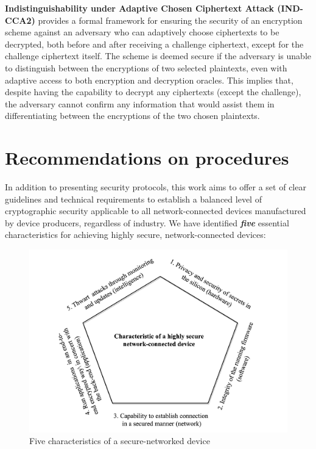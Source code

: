 \documentclass[pdflatex,sn-mathphys-num]{sn-jnl}%
\theoremstyle{thmstyleone}%
\theoremstyle{thmstyletwo}%
\theoremstyle{thmstylethree}%
\begin{document}
\noindent \textbf{Indistinguishability under Adaptive Chosen Ciphertext Attack (IND-CCA2)}  provides a formal framework for ensuring the security of an encryption scheme against an adversary who can adaptively choose ciphertexts to be decrypted, both before and after receiving a challenge ciphertext, except for the challenge ciphertext itself. The scheme is deemed secure if the adversary is unable to distinguish between the encryptions of two selected plaintexts, even with adaptive access to both encryption and decryption oracles. This implies that, despite having the capability to decrypt any ciphertexts (except the challenge), the adversary cannot confirm any information that would assist them in differentiating between the encryptions of the two chosen plaintexts.

\section{Recommendations on procedures}
\label{sec:2:requirements}


In addition to presenting security protocols, this work aims to offer a set of clear guidelines and technical requirements to establish a balanced level of cryptographic security applicable to all network-connected devices manufactured by device producers, regardless of industry. We have identified \emph{\textbf{five}} essential characteristics for achieving highly secure, network-connected devices:\\

\begin{figure}[htbp]
    \centering
    \includegraphics[width=0.5\linewidth]{characteristic-secured-device.pdf}
    \caption{Five characteristics of a secure-networked device}
    \label{fig:enter-label}
\end{figure}
\end{document}
